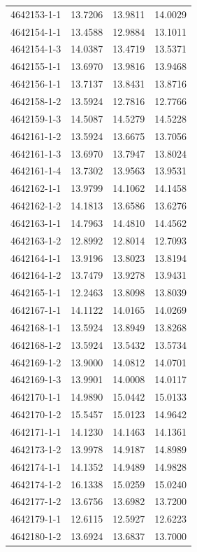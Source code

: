 \begin{longtable}{lrrr}
4642153-1-1 & 13.7206 & 13.9811 & 14.0029 \\
4642154-1-1 & 13.4588 & 12.9884 & 13.1011 \\
4642154-1-3 & 14.0387 & 13.4719 & 13.5371 \\
4642155-1-1 & 13.6970 & 13.9816 & 13.9468 \\
4642156-1-1 & 13.7137 & 13.8431 & 13.8716 \\
4642158-1-2 & 13.5924 & 12.7816 & 12.7766 \\
4642159-1-3 & 14.5087 & 14.5279 & 14.5228 \\
4642161-1-2 & 13.5924 & 13.6675 & 13.7056 \\
4642161-1-3 & 13.6970 & 13.7947 & 13.8024 \\
4642161-1-4 & 13.7302 & 13.9563 & 13.9531 \\
4642162-1-1 & 13.9799 & 14.1062 & 14.1458 \\
4642162-1-2 & 14.1813 & 13.6586 & 13.6276 \\
4642163-1-1 & 14.7963 & 14.4810 & 14.4562 \\
4642163-1-2 & 12.8992 & 12.8014 & 12.7093 \\
4642164-1-1 & 13.9196 & 13.8023 & 13.8194 \\
4642164-1-2 & 13.7479 & 13.9278 & 13.9431 \\
4642165-1-1 & 12.2463 & 13.8098 & 13.8039 \\
4642167-1-1 & 14.1122 & 14.0165 & 14.0269 \\
4642168-1-1 & 13.5924 & 13.8949 & 13.8268 \\
4642168-1-2 & 13.5924 & 13.5432 & 13.5734 \\
4642169-1-2 & 13.9000 & 14.0812 & 14.0701 \\
4642169-1-3 & 13.9901 & 14.0008 & 14.0117 \\
4642170-1-1 & 14.9890 & 15.0442 & 15.0133 \\
4642170-1-2 & 15.5457 & 15.0123 & 14.9642 \\
4642171-1-1 & 14.1230 & 14.1463 & 14.1361 \\
4642173-1-2 & 13.9978 & 14.9187 & 14.8989 \\
4642174-1-1 & 14.1352 & 14.9489 & 14.9828 \\
4642174-1-2 & 16.1338 & 15.0259 & 15.0240 \\
4642177-1-2 & 13.6756 & 13.6982 & 13.7200 \\
4642179-1-1 & 12.6115 & 12.5927 & 12.6223 \\
4642180-1-2 & 13.6924 & 13.6837 & 13.7000 \\

\end{longtable}
